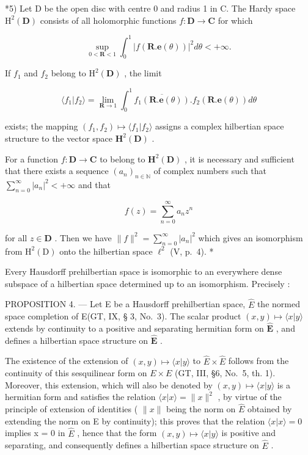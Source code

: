 *5) Let D be the open disc with centre 0 and radius 1 in C. The Hardy space \(\mathrm{H}^2 (\mathbf{D})\) consists of all holomorphic functions \(f\colon \mathbf{D}\to \mathbf{C}\) for which

\[
\sup _ {0 <   \mathbf {R} <   1} \int_ {0} ^ {1} | f (\mathbf {R}. \mathbf {e} (\theta)) | ^ {2} d \theta <   + \infty .
\]

If \(f_{1}\) and \(f_{2}\) belong to \(\mathrm{H}^2 (\mathbf{D})\) , the limit

\[
\langle f _ {1} | f _ {2} \rangle = \lim _ {\mathbf {R} \rightarrow 1} \int_ {0} ^ {1} \overline {{{f _ {1} (\mathbf {R} . \mathbf {e} (\theta))}}}. f _ {2} (\mathbf {R}. \mathbf {e} (\theta)) d \theta
\]

exists; the mapping \((f_1, f_2) \mapsto \langle f_1 | f_2 \rangle\) assigns a complex hilbertian space structure to the vector space \(\mathbf{H}^2(\mathbf{D})\) .

For a function \(f: \mathbf{D} \to \mathbf{C}\) to belong to \(\mathbf{H}^2(\mathbf{D})\) , it is necessary and sufficient that there exists a sequence \((a_n)_{n \in \mathbb{N}}\) of complex numbers such that \(\sum_{n=0}^{\infty} |a_n|^2 < +\infty\) and that

\[
f (z) = \sum_ {n = 0} ^ {\infty} a _ {n} z ^ {n}
\]

for all \(z \in \mathbf{D}\) . Then we have \(\| f\|^2 = \sum_{n=0}^{\infty} |a_n|^2\) which gives an isomorphism from \(\mathrm{H}^2(\mathrm{D})\) onto the hilbertian space \(\ell^2\) (V, p.~4). *

Every Hausdorff prehilbertian space is isomorphic to an everywhere dense subspace of a hilbertian space determined up to an isomorphism. Precisely :

PROPOSITION 4. --- Let E be a Hausdorff prehilbertian space, \(\hat{E}\) the normed space completion of E(GT, IX, § 3, No.~3). The scalar product \((x, y) \mapsto \langle x|y \rangle\) extends by continuity to a positive and separating hermitian form on \(\hat{\mathbf{E}}\) , and defines a hilbertian space structure on \(\hat{\mathbf{E}}\) .

The existence of the extension of \((x, y) \mapsto \langle x|y \rangle\) to \(\hat{E} \times \hat{E}\) follows from the continuity of this sesquilinear form on \(E \times E\) (GT, III, §6, No.~5, th. 1). Moreover, this extension, which will also be denoted by \((x, y) \mapsto \langle x|y \rangle\) is a hermitian form and satisfies the relation \(\langle x|x\rangle = \|x\|^2\) , by virtue of the principle of extension of identities ( \(\|x\|\) being the norm on \(\hat{E}\) obtained by extending the norm on E by continuity); this proves that the relation \(\langle x|x\rangle = 0\) implies x = 0 in \(\hat{E}\) , hence that the form \((x, y) \mapsto \langle x|y \rangle\) is positive and separating, and consequently defines a hilbertian space structure on \(\hat{E}\) .

